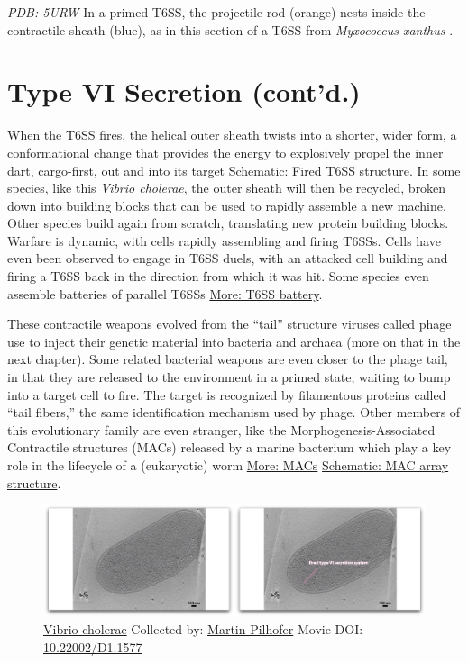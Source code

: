 \documentclass[]{tufte-book}
\begin{document}
\emph{PDB: 5URW} In a primed T6SS, the projectile rod (orange) nests
inside the contractile sheath (blue), as in this section of a T6SS from
\emph{Myxococcus xanthus} \citep{chang2017}.

\section{Type VI Secretion (cont'd.)}\label{type-vi-secretion-contd.}

When the T6SS fires, the helical outer sheath twists into a shorter,
wider form, a conformational change that provides the energy to
explosively propel the inner dart, cargo-first, out and into its target
\protect\hyperlink{Fired_T6SS_structure}{Schematic: Fired T6SS
structure}. In some species, like this \emph{Vibrio cholerae}, the outer
sheath will then be recycled, broken down into building blocks that can
be used to rapidly assemble a new machine. Other species build again
from scratch, translating new protein building blocks. Warfare is
dynamic, with cells rapidly assembling and firing T6SSs. Cells have even
been observed to engage in T6SS duels, with an attacked cell building
and firing a T6SS back in the direction from which it was hit. Some
species even assemble batteries of parallel T6SSs
\protect\hyperlink{T6SS_battery}{More: T6SS battery}.

These contractile weapons evolved from the ``tail'' structure viruses
called phage use to inject their genetic material into bacteria and
archaea (more on that in the next chapter). Some related bacterial
weapons are even closer to the phage tail, in that they are released to
the environment in a primed state, waiting to bump into a target cell to
fire. The target is recognized by filamentous proteins called ``tail
fibers,'' the same identification mechanism used by phage. Other members
of this evolutionary family are even stranger, like the
Morphogenesis-Associated Contractile structures (MACs) released by a
marine bacterium which play a key role in the lifecycle of a
(eukaryotic) worm \protect\hyperlink{MACs}{More: MACs}
\protect\hyperlink{MAC_array_structure}{Schematic: MAC array structure}.





\begin{figure}
\includegraphics{movie_stills/9_7} \caption[\protect\hyperlink{tree}{Vibrio cholerae} Collected by:
\protect\hyperlink{martin_pilhofer}{Martin Pilhofer} Movie DOI:
\href{https://doi.org/10.22002/D1.1577}{10.22002/D1.1577}]{\protect\hyperlink{tree}{Vibrio cholerae} Collected by:
\protect\hyperlink{martin_pilhofer}{Martin Pilhofer} Movie DOI:
\href{https://doi.org/10.22002/D1.1577}{10.22002/D1.1577}}\label{fig:9-7}
\end{figure}
\end{document}
